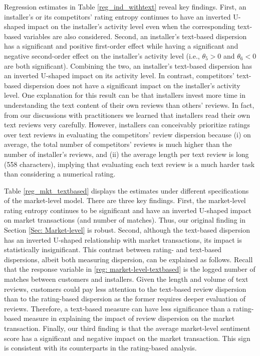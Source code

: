 \documentclass[mnsc,blindrev]{informs3}
\begin{document}
{\color{black} Regression estimates in Table \ref{reg_ind_withtext} reveal key findings. First, an installer's or its competitors' rating entropy continues to have an inverted U-shaped impact on the installer's activity level even when the corresponding text-based variables are also considered.  Second, an installer's text-based dispersion has a significant and positive first-order effect while having a significant and negative second-order effect on the installer's activity level (i.e., $\theta_{5} > 0$ and $\theta_{6} < 0$ are both significant). Combining the two, an installer's text-based dispersion has an inverted U-shaped impact on its activity level. In contrast, competitors' text-based dispersion does not have a significant impact on the installer's activity level. One explanation for this result can be that installers invest more time in understanding the text content of their own reviews than others' reviews. In fact, from our discussions with practitioners we learned that installers read their own text reviews very carefully. However, installers can conceivably prioritize ratings over text reviews in evaluating the competitors' review dispersion because (i) on average, the total number of competitors' reviews is much higher than the number of installer's reviews, and (ii) the average length per text review is long (558 characters), implying that evaluating each text review is a much harder task than considering a numerical rating.}


	
{\color{black}Table \ref{reg_mkt_textbased} displays the estimates under different specifications of the market-level model. There are three key findings. First, the  market-level rating entropy continues to be significant and have an inverted U-shaped impact on market transactions (and number of matches). Thus, our original finding in Section \ref{Sec: Market-level} is robust. Second, although the text-based dispersion has an inverted U-shaped relationship with market transactions, its impact is statistically insignificant.  This contrast between rating- and text-based dispersions, albeit both measuring dispersion, can be explained as follows. Recall that the response variable in \eqref{reg: market-level-textbased} is the logged number of matches between customers and installers. Given the length and volume of text reviews, customers could pay less attention to the text-based review dispersion than to the rating-based dispersion as the former requires deeper evaluation of reviews. Therefore, a text-based measure can have less significance than a rating-based measure in explaining the impact of review dispersion on the market transaction.  Finally, our third finding is that the average market-level sentiment score has a significant and negative impact on the market transaction. This sign is consistent with its counterparts in the rating-based analysis.}
\end{document}
